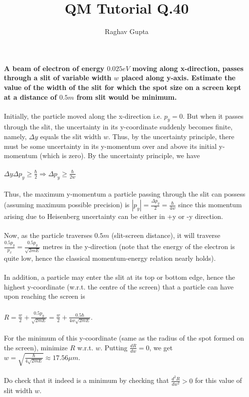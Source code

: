 \documentclass{article}
\begin{document}
\title{QM Tutorial Q.40}
\author{Raghav Gupta}
\maketitle
\textbf{A beam of electron of energy \(0.025 eV\) moving along x-direction, passes through a slit of variable width \(w\) placed along y-axis. Estimate the value of the width of the slit for which the spot size on a screen kept at a distance of \(0.5 m\) from slit would be minimum.}\\\\Initially, the particle moved along the x-direction i.e. \(p_y = 0\). But when it passes through the slit, the uncertainty in its y-coordinate suddenly becomes finite, namely, \(\Delta y\) equals the slit width \(w\). Thus, by the uncertainty principle, there must be some uncertainty in its y-momentum over and above its initial y-momentum (which is zero). By the uncertainty principle, we have\\\\\(\Delta y \Delta p_y \geq \frac{\hbar}{2} \Rightarrow \Delta p_y \geq \frac{\hbar}{2w}\)\\\\Thus, the maximum y-momentum a particle passing through the slit can possess (assuming maximum possible precision) is \(|p_y| = \frac{\Delta p_y}{2} = \frac{\hbar}{4w}\) since this momentum arising due to Heisenberg uncertainty can be either in +y or -y direction.\\
\\Now, as the particle traverses \(0.5 m\) (slit-screen distance), it will traverse \(\frac{0.5p_y}{p_x} = \frac{0.5p_y}{\sqrt{2mE}}\) metres in the y-direction (note that the energy of the electron is quite low, hence the classical momentum-energy relation nearly holds).\\\\In addition, a particle may enter the slit at its top or bottom edge, hence the highest y-coordinate (w.r.t. the centre of the screen) that a particle can have upon reaching the screen is\\\\ \(R = \frac{w}{2} + \frac{0.5p_y}{\sqrt{2mE}} = \frac{w}{2} + \frac{0.5\hbar}{4w\sqrt{2mE}}\).\\\\For the minimum of this y-coordinate (same as the radius of the spot formed on the screen), minimize \(R\) w.r.t. \(w\). Putting \(\frac{dR}{dw} = 0\), we get \\\(w = \sqrt{\frac{\hbar}{4\sqrt{2mE}}} \approx 17.56 \mu m\). \\\\Do check that it indeed is a minimum by checking that \(\frac{d^2R}{dw^2} > 0\) for this value of slit width \(w\). 
\end{document}
